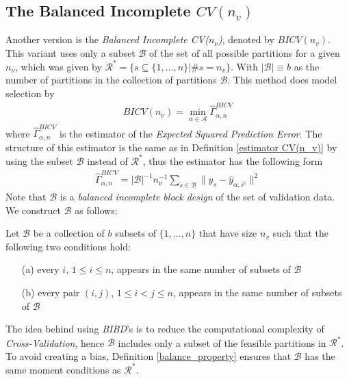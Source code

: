 \documentclass[Research_Module_ES.tex]{subfiles}
\begin{document}
\subsection{The Balanced Incomplete $CV(n_v)$}
Another version is the \textit{Balanced Incomplete CV($n_\nu$)}, denoted by $BICV(n_v)$. This variant uses only a subset $\mathcal{B}$ of the set of all possible partitions for a given $n_\nu$, which was given by $\mathcal{R}^\ast= \{s\subseteq\{1,\dots,n\}|\# s=n_v\}$. With $|\mathcal{B}|\equiv b$ as the number of partitions in the collection of partitions $\mathcal{B}$. This method does model selection by 
\begin{align*}
	BICV(n_\nu)=\min_{\alpha\in\mathcal{A}}\hat{\Gamma}_{\alpha,n}^{BICV}
\end{align*}
where $\hat{\Gamma}_{\alpha,n}^{BICV}$ is the estimator of the \textit{Expected Squared Prediction Error}. The structure of this estimator is the same as in Definition \ref{estimator CV(n_v)} by using the subset $\mathcal{B}$ instead of $\mathcal{R}^\ast$, thus the estimator has the following form
\begin{align*}
	\hat{\Gamma}_{\alpha,n}^{BICV}=|\mathcal{B}|^{-1}n_\nu^{-1}\sum_{s\in\mathcal{B}}\parallel y_s-\hat{y}_{\alpha,s^c}\parallel^2
\end{align*}
Note that $\mathcal{B}$ is a \textit{balanced incomplete block design} of the set of validation data. We construct $\mathcal{B}$ as follows: 
\begin{defi}
\label{balance_property}
Let $\mathcal{B}$ be a collection of $b$ subsets of $\{ 1,\dots,n\}$ that have size $n_v$ such that the following two conditions hold:
\begin{enumerate}
\item[(a)] every $i$, $1\le i \le n$, appears in the same number of subsets of $\mathcal{B}$
\item[(b)] every pair $(i,j)$, $1\le i < j \le n$, appears in the same number of subsets of $\mathcal{B}$
\end{enumerate}
\end{defi}
The idea behind using \textit{BIBD}'s is to reduce the computational complexity of \textit{Cross-Validation}, hence $\mathcal{B}$ includes only a subset of the feasible partitions in $\mathcal{R}^\ast$. To avoid creating a bias, Definition \ref{balance_property} ensures that $\mathcal{B}$ has the same moment conditions as $\mathcal{R}^\ast$. \\
\end{document}
